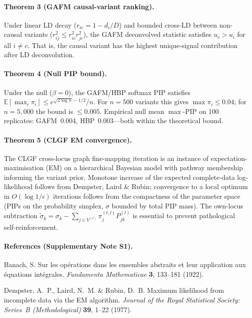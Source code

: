 \paragraph{Theorem 3 (GAFM causal-variant ranking).}
Under linear LD decay ($r_{ic} = 1 - d_i/D$) and bounded cross-LD
between non-causal variants ($r^2_{ij} \leq r^2_{ic} r^2_{jc}$),
the GAFM deconvolved statistic satisfies
$u_c > u_i$ for all $i \neq c$. That is, the causal variant has
the highest unique-signal contribution after LD deconvolution.

\paragraph{Theorem 4 (Null PIP bound).}
Under the null ($\beta{=}0$), the GAFM/HBP softmax PIP satisfies
$\mathbb{E}[\max_i \pi_i] \leq e^{\sqrt{2 \log n} - 1/2} / n$. For
$n = 500$ variants this gives $\max \pi_i \leq 0.04$; for $n = 5{,}000$
the bound is $\leq 0.005$. Empirical null mean
$\max$-PIP on 100 replicates: GAFM~0.004, HBP~0.003---both within the
theoretical bound.

\paragraph{Theorem 5 (CLGF EM convergence).}
The CLGF cross-locus graph fine-mapping iteration is an instance of
expectation-maximisation (EM) on a hierarchical Bayesian model with
pathway membership informing the variant prior. Monotone increase
of the expected complete-data log-likelihood follows from
Dempster, Laird \& Rubin\cite{dempster1977maximum}; convergence to a
local optimum in
$O(\log 1/\epsilon)$ iterations follows from the compactness of the
parameter space (PIPs on the probability simplex, $\sigma$ bounded
by total PIP mass). The own-locus subtraction
$\tilde{\sigma}_k = \sigma_k - \sum_{j \in V^{(l)}} \pi_j^{(t,l)} P^{(l)}_{jk}$
is essential to prevent pathological self-reinforcement.

\paragraph{References (Supplementary Note S1).}
\begin{enumerate}[leftmargin=2.2em,itemsep=0.2em,topsep=0.2em,label={[\arabic*]}]
\item Banach, S. Sur les op\'erations dans les ensembles abstraits
et leur application aux \'equations int\'egrales.
\textit{Fundamenta Mathematicae} \textbf{3}, 133--181 (1922).
\item Dempster, A.~P., Laird, N.~M. \& Rubin, D.~B. Maximum
likelihood from incomplete data via the EM algorithm.
\textit{Journal of the Royal Statistical Society: Series~B
(Methodological)} \textbf{39}, 1--22 (1977).
\end{enumerate}

